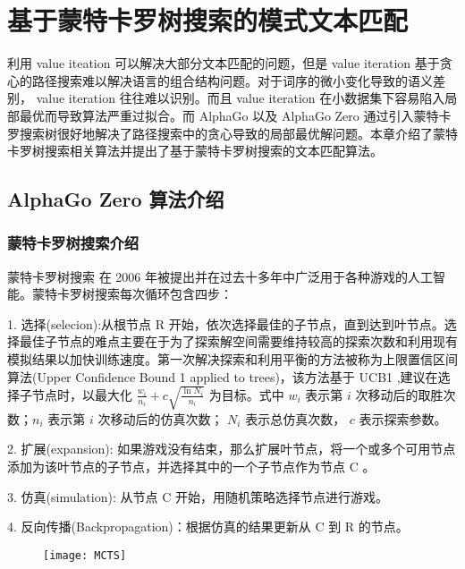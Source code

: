 \chapter{基于蒙特卡罗树搜索的模式文本匹配}
\label{chap:Zero}
利用 value iteation 可以解决大部分文本匹配的问题，但是 value iteration 基于贪心的路径搜索难以解决语言的组合结构问题。对于词序的微小变化导致的语义差别， value iteration 往往难以识别。而且 value iteration 在小数据集下容易陷入局部最优而导致算法严重过拟合。而 AlphaGo 以及 AlphaGo Zero 通过引入蒙特卡罗搜索树很好地解决了路径搜索中的贪心导致的局部最优解问题。本章介绍了蒙特卡罗树搜索相关算法并提出了基于蒙特卡罗树搜索的文本匹配算法。

\section{AlphaGo Zero 算法介绍}
\subsection{蒙特卡罗树搜索介绍}\label{sec:MCTS_intro}
蒙特卡罗树搜索\cite{Coulom2006EfficientSA} 在 2006 年被提出并在过去十多年中广泛用于各种游戏的人工智能\cite{Lorentz2008AmazonsDM, Enzenberger2010FuegoA,Buro2009ImprovingSE}。蒙特卡罗树搜索每次循环包含四步：

1. 选择(selecion):从根节点 R 开始，依次选择最佳的子节点，直到达到叶节点。选择最佳子节点的难点主要在于为了探索解空间需要维持较高的探索次数和利用现有模拟结果以加快训练速度。第一次解决探索和利用平衡的方法被称为上限置信区间算法\cite{Kocsis2006BanditBM}(Upper Confidence Bound 1 applied to trees)，该方法基于 UCB1 \cite{Auer2002FinitetimeAO},建议在选择子节点时，以最大化 $\frac{w_i}{n_i} + c\sqrt{\frac{\ln N_i}{n_i}}$ 为目标。式中 $w_i$ 表示第 $i$ 次移动后的取胜次数；$n_i$ 表示第 $i$ 次移动后的仿真次数； $N_i$ 表示总仿真次数， $c$ 表示探索参数。

2. 扩展(expansion): 如果游戏没有结束，那么扩展叶节点，将一个或多个可用节点添加为该叶节点的子节点，并选择其中的一个子节点作为节点 C 。

3. 仿真(simulation): 从节点 C 开始，用随机策略选择节点进行游戏。

4. 反向传播(Backpropagation)：根据仿真的结果更新从 C 到 R 的节点。

\begin{figure}[H]
    \centering
    \texttt{[image: MCTS]}
    \label{fig:MCTS}
\end{figure}

